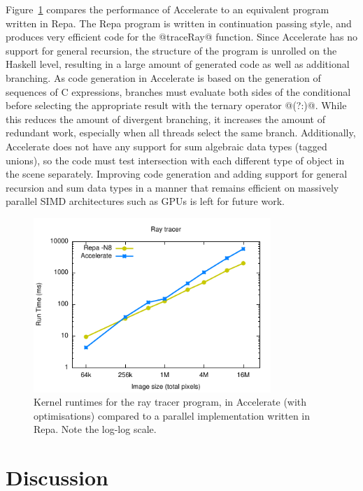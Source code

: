 Figure~\ref{fig:ray} compares the performance of Accelerate to an equivalent
program written in Repa. The Repa program is written in continuation passing
style, and produces very efficient code for the @traceRay@ function. Since
Accelerate has no support for general recursion, the structure of the program is
unrolled on the Haskell level, resulting in a large amount of generated code as
well as additional branching. As code generation in Accelerate is based on the
generation of sequences of C expressions, branches must evaluate both sides of
the conditional before selecting the appropriate result with the ternary
operator @(?:)@. While this reduces the amount of divergent branching, it
increases the amount of redundant work, especially when all threads select the
same branch. Additionally, Accelerate does not have any support for sum
algebraic data types (tagged unions), so the code must test intersection with
each different type of object in the scene separately. Improving code generation
and adding support for general recursion and sum data types in a manner that
remains efficient on massively parallel SIMD architectures such as GPUs is left
for future work.

\begin{figure}
    \begin{center}
        \includegraphics[width=0.8\textwidth]{images/sec-6/ray/ray}
    \end{center}
    \caption[Ray tracing kernel benchmarks]{Kernel runtimes for the ray tracer
        program, in Accelerate (with optimisations) compared to a parallel
    implementation written in Repa. Note the log-log scale.}
\label{fig:ray}
\end{figure}


\section{Discussion}

